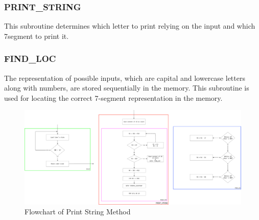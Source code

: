 \documentclass[titlepage]{article}
\begin{document}
	\subsubsection{PRINT\_STRING}
	This subroutine determines which letter to print relying on the input and which 7segment to print it.
	\subsubsection{FIND\_LOC}
	The representation of possible inputs, which are capital and lowercase letters along with numbers, are stored sequentially in the memory. This subroutine is used for locating the correct 7-segment representation in the memory.
	\begin{figure}[h]
		\centering
		\includegraphics[scale=.15]{../images/print_string.pdf}
		\caption{Flowchart of Print String Method}
	\end{figure}
\end{document}
